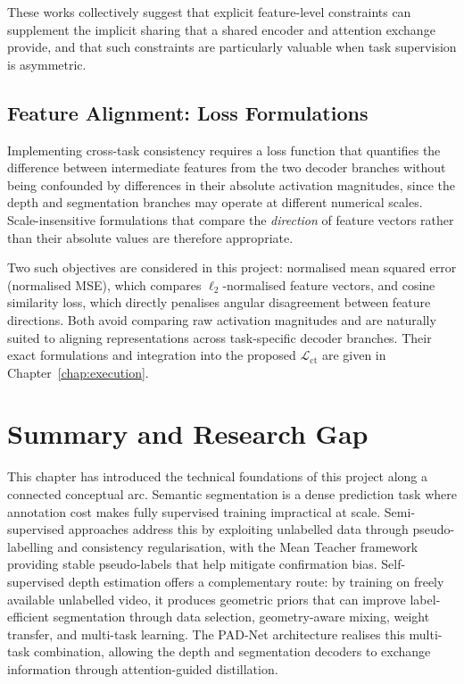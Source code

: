 These works collectively suggest that explicit feature-level constraints
can supplement the implicit sharing that a shared encoder and attention
exchange provide, and that such constraints are particularly valuable
when task supervision is asymmetric.

\subsection{Feature Alignment: Loss Formulations}
\label{sec:ct-losses}

Implementing cross-task consistency requires a loss function that
quantifies the difference between intermediate features from the two
decoder branches without being confounded by differences in their
absolute activation magnitudes, since the depth and segmentation branches
may operate at different numerical scales. Scale-insensitive formulations
that compare the \emph{direction} of feature vectors rather than their
absolute values are therefore appropriate.

Two such objectives are considered in this project: normalised mean
squared error (normalised MSE), which compares $\ell_2$-normalised
feature vectors, and cosine similarity loss, which directly penalises
angular disagreement between feature directions. Both avoid comparing
raw activation magnitudes and are naturally suited to aligning
representations across task-specific decoder branches. Their exact
formulations and integration into the proposed $\mathcal{L}_\text{ct}$
are given in Chapter~\ref{chap:execution}.

\section{Summary and Research Gap}
\label{sec:summary-gap}

This chapter has introduced the technical foundations of this project
along a connected conceptual arc. Semantic segmentation is a dense
prediction task where annotation cost makes fully supervised training
impractical at scale. Semi-supervised approaches address this by
exploiting unlabelled data through pseudo-labelling and consistency
regularisation, with the Mean Teacher framework providing stable pseudo-labels that help
mitigate confirmation bias. Self-supervised depth estimation offers a
complementary route: by training on freely available
unlabelled video, it produces geometric priors that can improve
label-efficient segmentation through data selection, geometry-aware
mixing, weight transfer, and multi-task learning. The PAD-Net
architecture realises this multi-task combination, allowing the depth
and segmentation decoders to exchange information through attention-guided
distillation.


